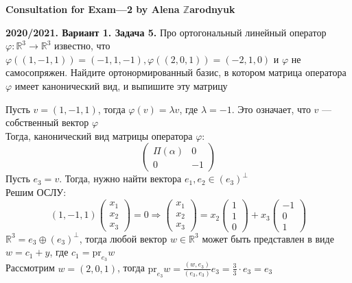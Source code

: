 \documentclass[a4paper]{article}
\newcommand{\pr}{\text{pr}}
\begin{document}
\begin{center}
    \LARGE{\textbf{Consultation for Exam—2 by Alena $\mathbb{Z}$arodnyuk}}
\end{center}

\begin{tcolorbox}[colback=blue!20!white, colframe=black!100!black]
    \textbf{2020/2021. Вариант 1. Задача 5.} Про ортогональный линейный оператор $\varphi:\mathbb{R}^3\rightarrow\mathbb{R}^3$ известно, что $\varphi((1, -1, 1))=(-1, 1, -1),\varphi((2, 0, 1))=(-2, 1, 0)$ и $\varphi$ не самосопряжен. Найдите ортонормированный базис, в котором матрица оператора $\varphi$ имеет канонический вид, и выпишите эту матрицу
\end{tcolorbox}
\indent Пусть $v=(1,-1,1)$, тогда $\varphi(v)=\lambda v$, где $\lambda=-1$. Это означает, что $v$ — собственный вектор $\varphi$\\[2mm]
\indent Тогда, канонический вид матрицы оператора $\varphi$:
\begin{equation*}
    \begin{pmatrix}
        \Pi(\alpha)&0\\
        0&-1
    \end{pmatrix}
\end{equation*}
\indent Пусть $e_3=v$. Тогда, нужно найти вектора $e_1,e_2\in (e_3)^{\perp}$\\[2mm]
\indent Решим ОСЛУ: $$(1, -1, 1)\begin{pmatrix}
    x_1\\
    x_2\\
    x_3
\end{pmatrix}=0\Longrightarrow\begin{pmatrix}
    x_1\\
    x_2\\
    x_3
\end{pmatrix}=x_2\begin{pmatrix}
    1\\
    1\\
    0
\end{pmatrix}+x_3\begin{pmatrix}
    -1\\
    0\\
    1
\end{pmatrix}$$
\indent $\mathbb{R}^3=e_3\oplus(e_3)^{\perp}$, тогда любой вектор $w\in\mathbb{R}^3$ может быть представлен в виде $w=c_1+y$, где $c_1=\pr_{e_3}w$\\[2mm]
\indent Рассмотрим $w=(2,0,1)$, тогда $\pr_{e_3}w=\displaystyle\frac{(w, e_3)}{(e_3,e_3)}e_3=\frac{3}{3}\cdot e_3=e_3$\\[2mm]
\end{document}
